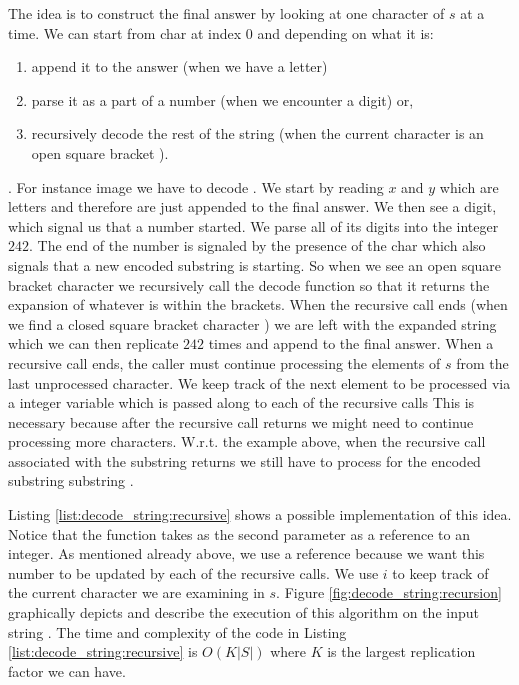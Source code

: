 The idea is to construct the final answer by looking at one character of $s$ at a time. We can start
from char at index $0$ and depending on what it is:
\begin{enumerate}
	\item append it to the answer (when we have a letter)
	\item parse it as a part of a number (when we encounter a digit) or,
	\item recursively decode the rest of the string (when the current character is an open square
		  bracket \inline{'['}).
\end{enumerate}.
For instance image we have to decode .
We start by reading $x$ and $y$ which are letters and therefore are
just appended to the final answer.
We then see a digit, which signal us that a number started. 
We parse all of its digits into the integer $242$.
The end of the number is signaled by the presence of the char
\inline{'['} which also signals that a new encoded substring is starting.
So when we see an open
square bracket character we recursively call the decode function so that it returns the expansion of
whatever is within the brackets.
When the recursive call ends (when we find a closed square bracket
character \inline{']'}) we are left with the expanded string which we can then replicate $242$ times
and append to the final answer.
When a recursive call ends, the caller must continue processing the elements of $s$ from the last unprocessed character.
We keep track of the next element to be processed via a integer variable which is passed along to each of the recursive calls
This is necessary because after the
recursive call returns we might need to continue processing more characters. W.r.t. the example above, when the recursive call 
associated with the substring  returns we still have to process  for the encoded substring substring 
.

Listing \ref{list:decode_string:recursive} shows a possible implementation of this idea. 
Notice that the function  takes as the second parameter 
as a reference to an integer.
As mentioned already above, we use a reference because we want this number 
to be updated by each of the recursive calls.
We use $i$ to keep track of the current character we are examining in $s$. 
Figure \ref{fig:decode_string:recursion} graphically depicts and describe the execution 
of this algorithm  on the input string .
The time and complexity of the code in Listing \ref{list:decode_string:recursive} is $O(K|S|)$ where $K$ is the largest replication factor we can have.


